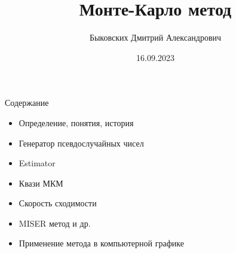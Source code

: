 \documentclass{beamer}
\title[МКМ]{Монте-Карло метод}
\author[Быковских Д.А.]{Быковских Дмитрий Александрович}
\date{16.09.2023}
\begin{document}
	\begin{frame}
		\titlepage
	\end{frame}
	\begin{frame}{Содержание}
		\begin{itemize}
			\item 
			Определение, понятия, история
			\item
			Генератор псевдослучайных чисел
			\item
			Estimator
			\item
			Квази МКМ
			\item 
			Скорость сходимости
			\item
			MISER метод и др.
			\item 
			Применение метода в компьютерной графике
		\end{itemize}
	\end{frame}
\end{document}
